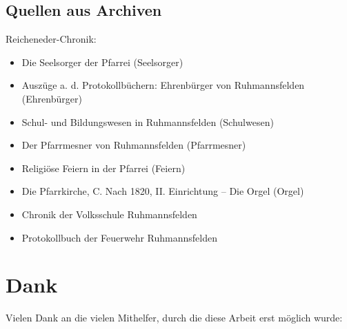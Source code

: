 \subsection{Quellen aus Archiven}

\noindent Reicheneder-Chronik:

\begin{itemize}

\item Die Seelsorger der Pfarrei (Seelsorger)
\item Auszüge a. d. Protokollbüchern: Ehrenbürger von Ruhmannsfelden
(Ehrenbürger)
\item Schul- und Bildungswesen in Ruhmannsfelden (Schulwesen)
\item Der Pfarrmesner von Ruhmannsfelden (Pfarrmesner)
\item Religiöse Feiern in der Pfarrei (Feiern)
\item Die Pfarrkirche, C. Nach 1820, II. Einrichtung – Die Orgel (Orgel)
\item Chronik der Volksschule Ruhmannsfelden
\item Protokollbuch der Feuerwehr Ruhmannsfelden

\end{itemize}

\section{Dank}

Vielen Dank an die vielen Mithelfer, durch die diese Arbeit erst möglich
wurde:

